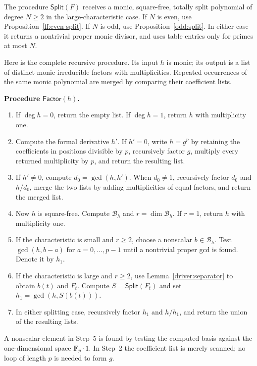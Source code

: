 The procedure $\mathsf{Split}(F)$ receives a monic, square-free, totally
split polynomial of degree $N\ge2$ in the large-characteristic case.  If
$N$ is even, use Proposition~\ref{ff:even-split}.  If $N$ is odd, use
Proposition~\ref{odd:split}.  In either case it returns a nontrivial proper
monic divisor, and uses table entries only for primes at most $N$.

Here is the complete recursive procedure.  Its input $h$ is monic; its
output is a list of distinct monic irreducible factors with multiplicities.
Repeated occurrences of the same monic polynomial are merged by comparing
their coefficient lists.

\medskip
\noindent\textbf{Procedure $\mathsf{Factor}(h)$.}
\begin{enumerate}
\item If $\deg h=0$, return the empty list.  If $\deg h=1$, return $h$ with
multiplicity one.

\item Compute the formal derivative $h'$.  If $h'=0$, write $h=g^p$ by
retaining the coefficients in positions divisible by $p$, recursively
factor $g$, multiply every returned multiplicity by $p$, and return the
resulting list.

\item If $h'\ne0$, compute $d_0=\gcd(h,h')$.  When $d_0\ne1$, recursively
factor $d_0$ and $h/d_0$, merge the two lists by adding multiplicities of
equal factors, and return the merged list.

\item Now $h$ is square-free.  Compute $\mathcal B_h$ and
$r=\dim\mathcal B_h$.  If $r=1$, return $h$ with multiplicity one.

\item If the characteristic is small and $r\ge2$, choose a nonscalar
$b\in\mathcal B_h$.  Test $\gcd(h,b-a)$ for $a=0,\ldots,p-1$ until a
nontrivial proper gcd is found.  Denote it by $h_1$.

\item If the characteristic is large and $r\ge2$, use
Lemma~\ref{driver:separator} to obtain $b(t)$ and $F_t$.  Compute
$S=\mathsf{Split}(F_t)$ and set $h_1=\gcd(h,S(b(t)))$.

\item In either splitting case, recursively factor $h_1$ and $h/h_1$,
and return the union of the resulting lists.
\end{enumerate}

A nonscalar element in Step~5 is found by testing the computed basis against
the one-dimensional space $\mathbf F_p\cdot1$.
In Step~2 the coefficient list is merely scanned; no loop of length $p$ is
needed to form $g$.


